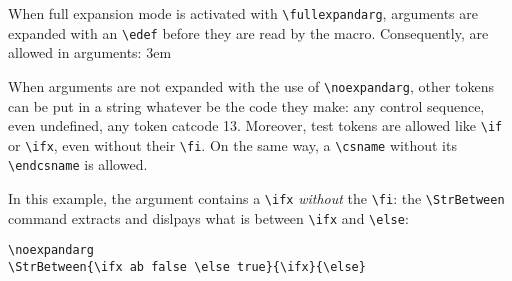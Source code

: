 \documentclass[a4paper,10pt]{article}
\newcommand\styleexercice{\footnotesize}
\newcommand\verbinline{\lstinline[basicstyle=\normalsize\ttfamily]}
\begin{document}
When full expansion mode is activated with \verbinline|\fullexpandarg|, arguments are expanded with an \verbinline|\edef| before they are read by the macro. Consequently, are allowed in arguments:
\parindent3em
\parindent0pt
\smallskip

When arguments are not expanded with the use of \verbinline|\noexpandarg|, other tokens can be put in a string whatever be the code they make: any control sequence, even undefined, any token catcode 13. Moreover, test tokens are allowed like \verbinline|\if| or \verbinline|\ifx|, even without their \verbinline|\fi|. On the same way, a \verbinline|\csname| without its \verbinline|\endcsname| is allowed.

In this example, the argument contains a \verbinline|\ifx| \emph{without} the \verbinline|\fi|: the \verbinline|\StrBetween| command extracts and dislpays what is between \verbinline|\ifx| and \verbinline|\else|:\par\medskip\nobreak

\begin{minipage}[c]{0.65\linewidth}
\begin{lstlisting}
\noexpandarg
\StrBetween{\ifx ab false \else true}{\ifx}{\else}
\end{lstlisting}%
\end{minipage}\hfill
\begin{minipage}[c]{0.35\linewidth}
	\styleexercice
	\noexpandarg
\end{minipage}
\medskip
\end{document}
